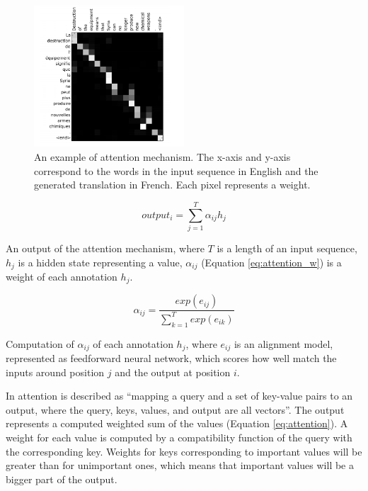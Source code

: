 \begin{figure}[hbt]
  \centering
  \includegraphics[width=0.5\textwidth]{figures/attention_example.png}
  \caption{An example of attention mechanism. The x-axis and y-axis correspond to the words in the input sequence in English and the generated translation in French. Each pixel represents a weight.\protect\footnotemark}
  \label{fig:attention}
\end{figure}

\begin{eqfloat}
\begin{equation} \label{eq:attention}
output_i = \sum_{j=1}^{T} \alpha_{ij} h_j
\end{equation}
\caption{An output of the attention mechanism, where $T$ is a length of an input sequence, $h_j$ is a hidden state representing a value, $\alpha_{ij}$ (Equation \ref{eq:attention_w}) is a weight of each annotation $h_j$.} 
\end{eqfloat}

\begin{eqfloat}
\begin{equation} \label{eq:attention_w}
\alpha_{ij} = \frac{exp(e_{ij})}{\sum_{k=1}^{T} exp(e_{ik})}
\end{equation}
\caption{Computation of $\alpha_{ij}$ of each annotation $h_j$, where $e_{ij}$ is an alignment model, represented as feedforward neural network, which scores how well match the inputs around position $j$ and the output at position $i$.} 
\end{eqfloat}

In \cite{vaswani2017attention} attention is described as ``mapping a query and a set of key-value pairs to an output, where the query, keys, values, and output are all vectors''. The output represents a computed weighted sum of the values (Equation \ref{eq:attention}). A weight for each value is computed by a compatibility function of the query with the corresponding key. Weights for keys corresponding to important values will be greater than for unimportant ones, which means that important values will be a bigger part of the output. 

